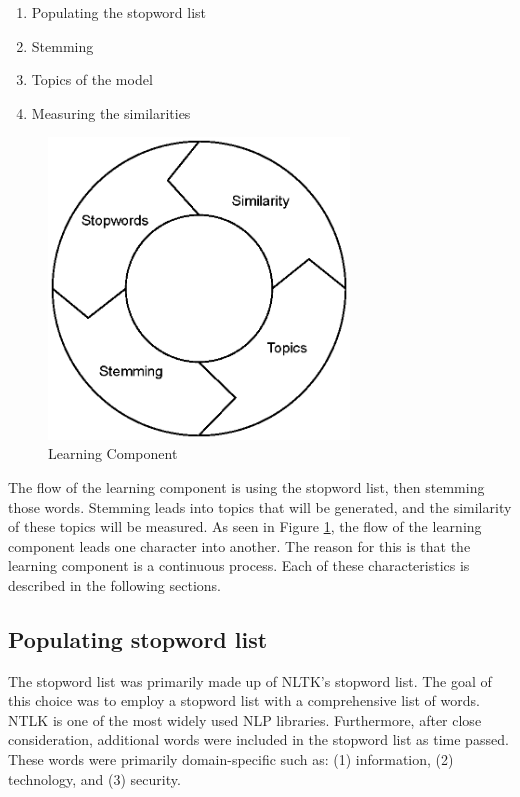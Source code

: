 \begin{enumerate}
    \item Populating the stopword list
    \item Stemming
    \item Topics of the model
    \item Measuring the similarities
\end{enumerate}

\begin{figure}[htbp]
\centering
\includegraphics[width=8cm]{./figures/learning.eps}
\caption{Learning Component}
\label{fig:core}
\end{figure}

The flow of the learning component is using the stopword list, then stemming those words. Stemming leads into topics that will be generated, and the similarity of these topics will be measured. As seen in Figure \ref{fig:core}, the flow of the learning component  leads one character into another. The reason for this is that the learning component is a continuous process. Each of these characteristics is described in the following sections.

\subsection{Populating stopword list}

The stopword list was primarily made up of NLTK’s stopword list. The goal of this choice was to employ a stopword list with a comprehensive list of words. NTLK is one of the most widely used NLP libraries. Furthermore, after close consideration, additional words were included in the stopword list as time passed. These words were primarily domain-specific such as: (1) information, (2) technology, and (3) security.

